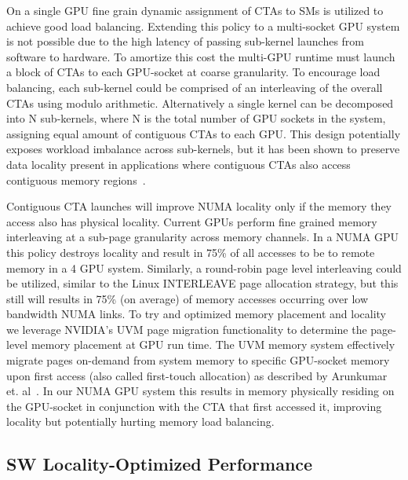 On a single GPU fine grain dynamic assignment of CTAs to SMs is utilized to 
achieve good load balancing.  Extending this policy to a multi-socket GPU 
system is not possible due to the high latency of passing sub-kernel 
launches from software to hardware.  To amortize this cost the multi-GPU runtime 
must launch a block of CTAs to each GPU-socket at coarse granularity.  To 
encourage load balancing, each sub-kernel could be comprised of an interleaving 
of the overall CTAs using modulo arithmetic.  Alternatively a single kernel can be 
decomposed into N sub-kernels, where N is the total number of GPU sockets in 
the system, assigning equal amount of contiguous CTAs to each GPU.  This design 
potentially exposes workload imbalance across sub-kernels, but it has 
been shown to preserve data locality present in applications where contiguous 
CTAs also access contiguous memory regions~\cite{Cabezas2015,Arunkumar2017}.

Contiguous CTA launches will improve NUMA locality only if the memory they access
also has physical locality. Current GPUs perform fine grained memory interleaving 
at a sub-page granularity 
across memory channels.  In a NUMA GPU this policy destroys locality and 
result in 75\% of all accesses to be to remote memory in a 4 GPU system. Similarly, a round-robin page level 
interleaving could be utilized, similar to the Linux INTERLEAVE page allocation 
strategy, but this still will results in 
75\% (on average) of memory accesses occurring over low bandwidth NUMA links. To
try and optimized memory placement and locality we leverage NVIDIA's 
UVM page migration functionality to determine the page-level memory placement
at GPU run time. The UVM memory system effectively migrate pages on-demand from system 
memory to specific GPU-socket memory upon first access (also called first-touch 
allocation) as described by Arunkumar et. al~\cite{Arunkumar2017}. In
our NUMA GPU system this results in memory physically residing on the GPU-socket
in conjunction with the CTA that first accessed it, improving locality but
potentially hurting memory load balancing.

\vspace{-.05in}
\subsection{SW Locality-Optimized Performance}

